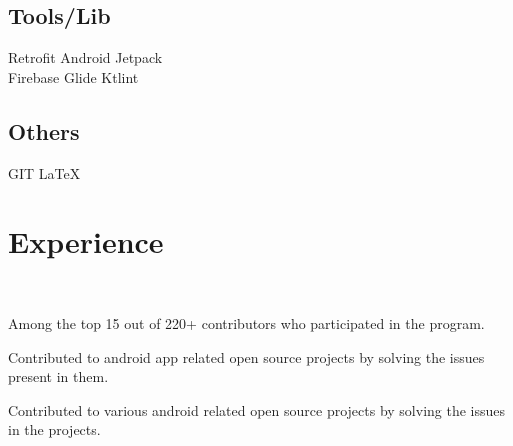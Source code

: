 \documentclass[]{deedy-resume-openfont}
\begin{document}
\begin{minipage}[t]{0.33\textwidth}
 \subsection{Tools/Lib}
 Retrofit \textbullet{} Android Jetpack\\ \textbullet{} Firebase \textbullet{} Glide \textbullet{} Ktlint
 \sectionsep
 \subsection{Others}
 GIT \textbullet{} \LaTeX
\sectionsep

%
%

\end{minipage} 
\hfill
\begin{minipage}[t]{0.66\textwidth} 


\section{Experience}

\
\begin{tightemize}\item Among the top 15 out of 220+ contributors who participated in the program.
\item Contributed to  android app related open source projects by solving the issues present in them.
\end{tightemize}
\sectionsep

\location{Dec 2018 - Jan 2019}
\begin{tightemize}\item Contributed to various android related open source projects by solving the issues in the projects.
\end{tightemize}
\sectionsep


\end{minipage}
\end{document}
